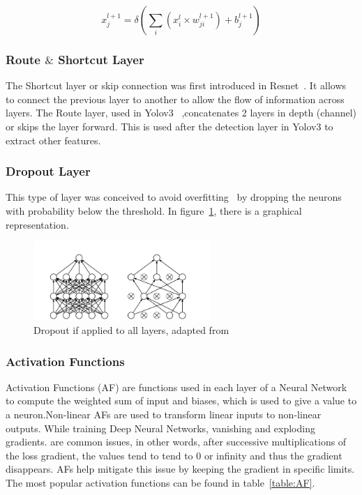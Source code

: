 \begin{equation} \label{equation:connected}
     \displaystyle x_{j}^{l+1}=\delta (\sum_{i}(x_{i}^{l} \times w_{ji}^{l+1})+ b_{j}^{l+1})
 \end{equation}
 

\subsubsection{Route $\&$ Shortcut Layer}

The Shortcut layer or skip connection was first introduced in
Resnet~\cite{resnet}.  It allows to connect the previous layer to another to
allow the flow of information across layers.  The Route layer, used in
Yolov3~\cite{yolov3} ,concatenates 2 layers in depth (channel) or skips the
layer forward. This is used after the detection layer in Yolov3 to extract other
features.

\subsubsection{Dropout Layer}

This type of layer was conceived to avoid overfitting~\cite{Dropout} by dropping
the neurons with probability below the threshold. In
figure~\ref{figure:Dropout}, there is a graphical representation.
\begin{figure}[!htbp]
    \centering
    \includegraphics[width=0.6\textwidth]{Figures/dropout.png}
    \caption{Dropout if applied to all layers, adapted from~\cite{Dropout}}
    \label{figure:Dropout}
\end{figure} 

\subsubsection{Activation Functions}

Activation Functions (AF) are functions used in each layer of a Neural Network
to compute the weighted sum of input and biases, which is used to give a value
to a neuron.Non-linear AFs are used to transform linear inputs to non-linear
outputs.  While training Deep Neural Networks, vanishing and exploding
gradients.  are common issues, in other words, after successive multiplications
of the loss gradient, the values tend to tend to 0 or infinity and thus the
gradient disappears.  AFs help mitigate this issue by keeping the gradient in
specific limits. The most popular activation functions can be found in
table~\ref{table:AF}.

